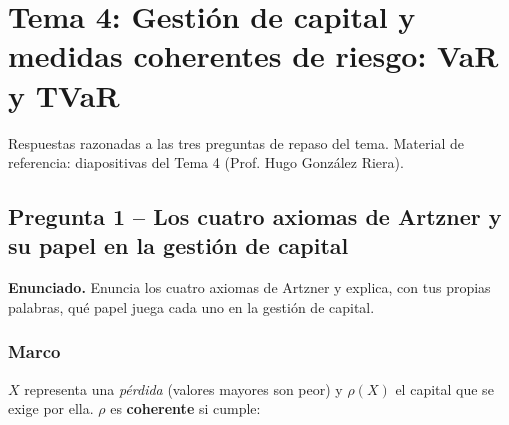 \documentclass[a4paper,12pt]{article}
\begin{document}
\restoregeometry
\newpage
{}
\setcounter{page}{1}

\section{Tema 4: Gestión de capital y medidas coherentes de riesgo: VaR y TVaR}
\label{sec:tema4repaso}
\noindent
Respuestas razonadas a las tres preguntas de repaso del tema. Material de referencia: diapositivas del Tema 4 (Prof. Hugo González Riera).

\subsection{Pregunta 1 -- Los cuatro axiomas de Artzner y su papel en la gesti\'on de capital}

\noindent\textbf{Enunciado.} Enuncia los cuatro axiomas de Artzner y explica, con tus propias palabras, qu\'e papel juega cada uno en la gesti\'on de capital.

\subsubsection*{Marco}
$X$ representa una \emph{p\'erdida} (valores mayores son peor) y $\rho(X)$ el capital que se exige por ella. $\rho$ es \textbf{coherente} si cumple:
\end{document}

